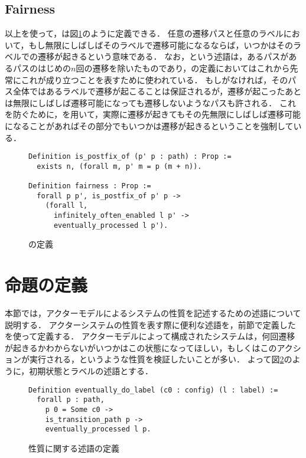 \subsection{Fairness}
以上を使って，\fairness は図\ref{code:formalization:fairness}のように定義できる．
任意の遷移パスと任意のラベルにおいて，もし無限にしばしばそのラベルで遷移可能になるならば，いつかはそのラベルでの遷移が起きるという意味である．
なお，という述語は，あるパスがあるパスのはじめの$n$回の遷移を除いたものであり，\fairness の定義においてはこれから先常にこれが成り立つことを表すために使われている．
もしがなければ，そのパス全体ではあるラベルで遷移が起こることは保証されるが，遷移が起こったあとは無限にしばしば遷移可能になっても遷移しないようなパスも許される．
これを防ぐために，を用いて，実際に遷移が起きてもその先無限にしばしば遷移可能になることがあればその部分でもいつかは遷移が起きるということを強制している．

\begin{figure}
\begin{lstlisting}
Definition is_postfix_of (p' p : path) : Prop :=
  exists n, (forall m, p' m = p (m + n)).

Definition fairness : Prop :=
  forall p p', is_postfix_of p' p ->
    (forall l,
      infinitely_often_enabled l p' ->
      eventually_processed l p').
\end{lstlisting}
\label{code:formalization:fairness}
\caption{\fairness の定義}
\end{figure}

\section{命題の定義}

本節では，アクターモデルによるシステムの性質を記述するための述語について説明する．
アクターシステムの性質を表す際に便利な述語を，前節で定義したを使って定義する．
アクターモデルによって構成されたシステムは，何回遷移が起きるかわからないがいつかはこの状態になってほしい，もしくはこのアクションが実行される，というような性質を検証したいことが多い．
よって図\ref{code:proof:ev-do-label}のように，初期状態とラベルの述語とする．

\begin{figure}
\begin{lstlisting}
Definition eventually_do_label (c0 : config) (l : label) :=
  forall p : path,
    p 0 = Some c0 ->
    is_transition_path p ->
    eventually_processed l p.
\end{lstlisting}
\label{code:proof:ev-do-label}
\caption{性質に関する述語の定義}
\end{figure}

